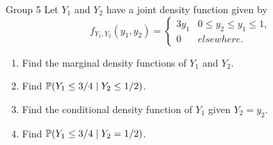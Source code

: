 \documentclass{article}
\begin{document}
\begin{problem}
    {Group 5}
    Let $Y_1$ and $Y_2$ have a joint density function given by
    \[
        f_{Y_1,Y_2} (y_1, y_2) = {
            \begin{cases}
                3y_1 & 0 \leq y_2 \leq y_1 \leq 1,\\
                0 & elsewhere.
            \end{cases}
        }
    \]
    \begin{enumerate}
        \item Find the marginal density functions of $Y_1$ and $Y_2$.
        \item Find $\condP{Y_1 \leq 3/4}{Y_2 \leq 1/2}$.
        \item Find the conditional density function of $Y_1$ given $Y_2 = y_2$.
        \item Find $\condP{Y_1 \leq 3/4}{Y_2 = 1/2}$.
    \end{enumerate}
\end{problem}
\end{document}
